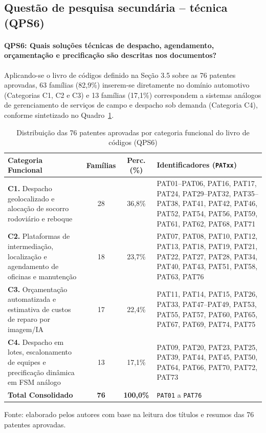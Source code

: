 \documentclass[12pt,a4paper]{article}
\begin{document}
\subsection{Questão de pesquisa secundária -- técnica (QPS6)}

\paragraph{QPS6: Quais soluções técnicas de despacho, agendamento, orçamentação e precificação são descritas nos documentos?}
Aplicando-se o livro de códigos definido na Seção 3.5 sobre as 76 patentes aprovadas, 63 famílias (82,9\%) inserem-se diretamente no domínio automotivo (Categorias C1, C2 e C3) e 13 famílias (17,1\%) correspondem a sistemas análogos de gerenciamento de serviços de campo e despacho sob demanda (Categoria C4), conforme sintetizado no Quadro~\ref{tab:qps6_cat}.

\begin{table}[htbp]
\centering\small
\caption{Distribuição das 76 patentes aprovadas por categoria funcional do livro de códigos (QPS6)}\label{tab:qps6_cat}
\begin{tabular}{p{3.8cm}ccp{6.4cm}}
\toprule
\textbf{Categoria Funcional} & \textbf{Famílias} & \textbf{Perc. (\%)} & \textbf{Identificadores (\texttt{PATxx})}\\
\midrule
\textbf{C1.} Despacho geolocalizado e alocação de socorro rodoviário e reboque & 28 & 36,8\% & PAT01--PAT06, PAT16, PAT17, PAT24, PAT29--PAT32, PAT35--PAT38, PAT41, PAT42, PAT46, PAT52, PAT54, PAT56, PAT59, PAT61, PAT62, PAT68, PAT71\\
\textbf{C2.} Plataformas de intermediação, localização e agendamento de oficinas e manutenção & 18 & 23,7\% & PAT07, PAT08, PAT10, PAT12, PAT13, PAT18, PAT19, PAT21, PAT22, PAT27, PAT28, PAT34, PAT40, PAT43, PAT51, PAT58, PAT63, PAT76\\
\textbf{C3.} Orçamentação automatizada e estimativa de custos de reparo por imagem/IA & 17 & 22,4\% & PAT11, PAT14, PAT15, PAT26, PAT33, PAT47--PAT49, PAT53, PAT55, PAT57, PAT60, PAT65, PAT67, PAT69, PAT74, PAT75\\
\textbf{C4.} Despacho em lotes, escalonamento de equipes e precificação dinâmica em FSM análogo & 13 & 17,1\% & PAT09, PAT20, PAT23, PAT25, PAT39, PAT44, PAT45, PAT50, PAT64, PAT66, PAT70, PAT72, PAT73\\
\midrule
\textbf{Total Consolidado} & \textbf{76} & \textbf{100,0\%} & \texttt{PAT01} a \texttt{PAT76}\\
\bottomrule
\end{tabular}

\smallskip
\footnotesize Fonte: elaborado pelos autores com base na leitura dos títulos e resumos das 76 patentes aprovadas.
\end{table}
\end{document}
